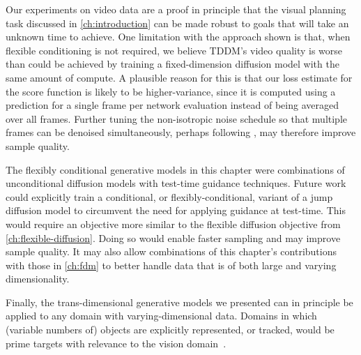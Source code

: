 Our experiments on video data are a proof in principle that the visual planning task discussed in \cref{ch:introduction} can be made robust to goals that will take an unknown time to achieve. One limitation with the approach shown is that, when flexible conditioning is not required, we believe TDDM's video quality is worse than could be achieved by training a fixed-dimension diffusion model with the same amount of compute. A plausible reason for this is that our loss estimate for the score function is likely to be higher-variance, since it is computed using a prediction for a single frame per network evaluation instead of being averaged over all frames. Further tuning the non-isotropic noise schedule so that multiple frames can be denoised simultaneously, perhaps following \citet{ruhe2024rolling}, may therefore improve sample quality.

The flexibly conditional generative models in this chapter were combinations of unconditional diffusion models with test-time guidance techniques. Future work could explicitly train a conditional, or flexibly-conditional, variant of a jump diffusion model to circumvent the need for applying guidance at test-time. This would require an objective more similar to the flexible diffusion objective from \cref{ch:flexible-diffusion}. Doing so would enable faster sampling and may improve sample quality. It may also allow combinations of this chapter's contributions with those in \cref{ch:fdm} to better handle data that is of both large and varying dimensionality.

Finally, the trans-dimensional generative models we presented can in principle be applied to any domain with varying-dimensional data. Domains in which (variable numbers of) objects are explicitly represented, or tracked, would be prime targets with relevance to the vision domain~\citep{luo2021multiple,niedoba2024diffusion}. 